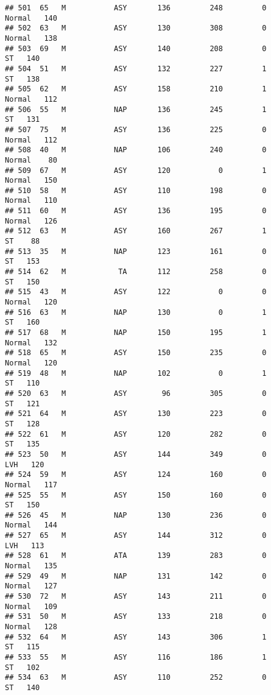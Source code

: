 \documentclass[
]{article}
\begin{document}
\begin{verbatim}
## 501  65   M           ASY       136         248         0     Normal   140
## 502  63   M           ASY       130         308         0     Normal   138
## 503  69   M           ASY       140         208         0         ST   140
## 504  51   M           ASY       132         227         1         ST   138
## 505  62   M           ASY       158         210         1     Normal   112
## 506  55   M           NAP       136         245         1         ST   131
## 507  75   M           ASY       136         225         0     Normal   112
## 508  40   M           NAP       106         240         0     Normal    80
## 509  67   M           ASY       120           0         1     Normal   150
## 510  58   M           ASY       110         198         0     Normal   110
## 511  60   M           ASY       136         195         0     Normal   126
## 512  63   M           ASY       160         267         1         ST    88
## 513  35   M           NAP       123         161         0         ST   153
## 514  62   M            TA       112         258         0         ST   150
## 515  43   M           ASY       122           0         0     Normal   120
## 516  63   M           NAP       130           0         1         ST   160
## 517  68   M           NAP       150         195         1     Normal   132
## 518  65   M           ASY       150         235         0     Normal   120
## 519  48   M           NAP       102           0         1         ST   110
## 520  63   M           ASY        96         305         0         ST   121
## 521  64   M           ASY       130         223         0         ST   128
## 522  61   M           ASY       120         282         0         ST   135
## 523  50   M           ASY       144         349         0        LVH   120
## 524  59   M           ASY       124         160         0     Normal   117
## 525  55   M           ASY       150         160         0         ST   150
## 526  45   M           NAP       130         236         0     Normal   144
## 527  65   M           ASY       144         312         0        LVH   113
## 528  61   M           ATA       139         283         0     Normal   135
## 529  49   M           NAP       131         142         0     Normal   127
## 530  72   M           ASY       143         211         0     Normal   109
## 531  50   M           ASY       133         218         0     Normal   128
## 532  64   M           ASY       143         306         1         ST   115
## 533  55   M           ASY       116         186         1         ST   102
## 534  63   M           ASY       110         252         0         ST   140

\end{verbatim}
\end{document}

